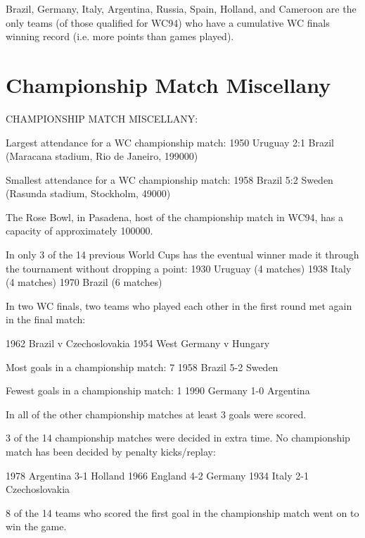 Brazil, Germany, Italy, Argentina, Russia, Spain, Holland, and Cameroon are the
only teams (of those qualified for WC94) who have a cumulative WC finals 
winning record (i.e. more points than games played).
\section{Championship Match Miscellany}
CHAMPIONSHIP MATCH MISCELLANY:

Largest attendance for a WC championship match:
1950 Uruguay 2:1 Brazil (Maracana stadium, Rio de Janeiro, 199000)

Smallest attendance for a WC championship match:
1958 Brazil 5:2 Sweden (Rasunda stadium, Stockholm, 49000)

The Rose Bowl, in Pasadena, host of the championship match in WC94, has a 
capacity of approximately 100000.

In only 3 of the 14 previous World Cups has the eventual winner made it through
the tournament without dropping a point:
1930 Uruguay (4 matches)
1938 Italy (4 matches)
1970 Brazil (6 matches)

In two WC finals, two teams who played each other in the first round met again 
in the final match:

1962 Brazil v Czechoslovakia
1954 West Germany v Hungary

Most goals in a championship match: 7
1958 Brazil 5-2 Sweden

Fewest goals in a championship match: 1
1990 Germany 1-0 Argentina

In all of the other championship matches at least 3 goals were scored.

3 of the 14 championship matches were decided in extra time. No championship 
match has been decided by penalty kicks/replay:

1978 Argentina 3-1 Holland
1966 England 4-2 Germany
1934 Italy 2-1 Czechoslovakia

8 of the 14 teams who scored the first goal in the championship match went on 
to win the game.
